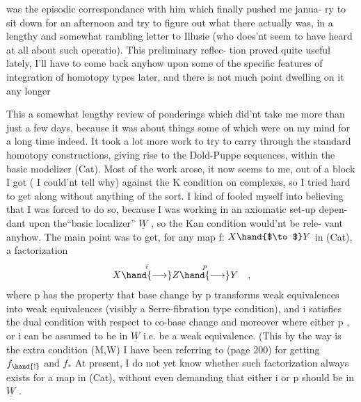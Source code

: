 was the episodic correspondance with him which finally pushed me   janua-%
ry to sit down for an afternoon and try to figure out what there actually
was, in a lengthy and somewhat rambling letter to Illusie (who does'nt
seem to have heard at all about such operatio). This preliminary reflec-%
tion proved quite useful lately, I'll have to come back anyhow upon some
of the specific features of integration of homotopy types later, and there
is not much point dwelling on it any longer  

 This  a \hand{(} somewhat lengthy\hand{!)} review of ponderings which did'nt take me
more than just a few days, because it was about things some of which were
on my mind for a long time indeed. It took  a lot more work to try to
carry through the standard homotopy constructions, giving rise to the
Dold-Puppe sequences, within the basic modelizer (Cat). Most of the work
arose, it now seems to me, out of a block I got ( I could'nt tell why)
against the K condition on complexes, so I tried hard to get along
without anything of the sort. I kind of fooled myself into believing that
I was forced to do so, because I was working in an axiomatic set-up depen-%
dant upon the``basic localizer'' $\underline{W}$ , so the Kan condition would'nt be rele-%
vant anyhow. The main point was to get, for any map f: $X \hand{$\to$} Y$ in (Cat),
a factorization
\[ X \overset{i}{\hand{\longrightarrow}} Z \overset{p}{\hand{\longrightarrow}} Y \quad , \]
where p has the property that base change by p transforms weak equivalences
into weak equivalences\hand{,}  (visibly a Serre-fibration type condition),
and i satisfies the dual condition with respect to co-base change\hand{;} and
moreover where either p , or i can be assumed to be in $\underline{W}$ i.e.  be a weak
equivalence. (This\hand{,} by the way\hand{,} is the extra condition  (M,W) I
have been referring to   (page 200)\deleted{\unsure{)}}\hand{,} for  getting $f_{\hand{!}}$ and $f_{*}$ 
At present, I do not yet know whether such factorization  always
exists for a map in (Cat), without even  demanding that either i
or p should be in $\underline{W}$ . \hand{$\Vert$}

